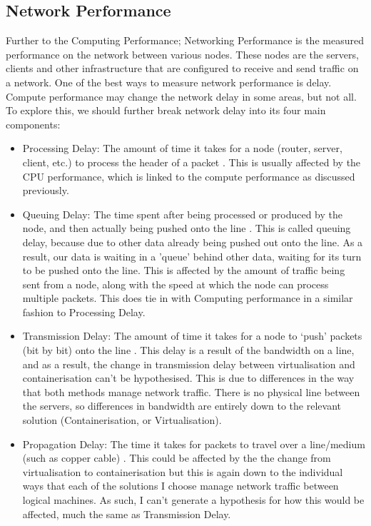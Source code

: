 \subsection{Network Performance}
Further to the Computing Performance; Networking Performance is the measured performance on the network between various nodes. These nodes are the servers, clients and other infrastructure that are configured to receive and send traffic on a network. One of the best ways to measure network performance is delay. Compute performance may change the network delay in some areas, but not all. To explore this, we should further break network delay into its four main components:
\begin{itemize}
  \item Processing Delay: The amount of time it takes for a node (router, server, client, etc.) to process the header of a packet \citep{ProcessingDelay}. This is usually affected by the CPU performance, which is linked to the compute performance as discussed previously.
  \item Queuing Delay: The time spent after being processed or produced by the node, and then actually being pushed onto the line \citep{QueuingDelay}. This is called queuing delay, because due to other data already being pushed out onto the line. As a result, our data is waiting in a 'queue' behind other data, waiting for its turn to be pushed onto the line. This is affected by the amount of traffic being sent from a node, along with the speed at which the node can process multiple packets. This does tie in with Computing performance in a similar fashion to Processing Delay.
  \item Transmission Delay: The amount of time it takes for a node to `push' packets (bit by bit) onto the line \citep[Chapter 7]{chen2005}. This delay is a result of the bandwidth on a line, and as a result, the change in transmission delay between virtualisation and containerisation can't be hypothesised. This is due to differences in the way that both methods manage network traffic. There is no physical line between the servers, so differences in bandwidth are entirely down to the relevant solution (Containerisation, or Virtualisation).
  \item Propagation Delay: The time it takes for packets to travel over a line/medium (such as copper cable) \citep{PropogationDelay}. This could be affected by the the change from virtualisation to containerisation but this is again down to the individual ways that each of the solutions I choose manage network traffic between logical machines. As such, I can't generate a hypothesis for how this would be affected, much the same as Transmission Delay.
\end{itemize}

